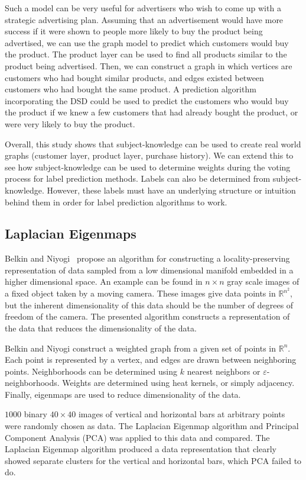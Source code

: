 Such a model can be very useful for advertisers who wish to come up with a
strategic advertising plan. Assuming that an advertisement would have more success if it were shown
to people more likely to buy the product being advertised, we can use the graph model to predict
which customers would buy the product. The product layer can be used to find all products similar to
the product being advertised. Then, we can construct a graph in which vertices are customers who had
bought similar products, and edges existed between customers who had bought the same product. A
prediction algorithm incorporating the DSD could be used to predict the customers who would buy the
product if we knew a few customers that had already bought the product, or were very likely to buy
the product.

Overall, this study shows that subject-knowledge can be used to create real
world graphs (customer layer, product layer, purchase history). We can extend
this to see how subject-knowledge can be used to determine weights during
the voting process for label prediction methods. Labels can also be 
determined from subject-knowledge. However, these labels must have an
underlying structure or intuition behind them in order for label prediction
algorithms to work.


\subsection{Laplacian Eigenmaps} Belkin and Niyogi~\cite{belkin2002laplacian} propose an algorithm
for constructing a locality-preserving representation of data sampled from a low dimensional
manifold embedded in a higher dimensional space. An example can be found in $n\times n$ gray scale
images of a fixed object taken by a moving camera. These images give data points in
$\mathbb{R}^{n^{2}}$, but the inherent dimensionality of this data should be the number of degrees
of freedom of the camera. The presented algorithm constructs a representation of the data that
reduces the dimensionality of the data.

Belkin and Niyogi construct a weighted graph from a given set of points
in $\mathbb{R}^{n}$. Each point is represented by a vertex, and edges are drawn between neighboring
points. Neighborhoods can be determined using $k$ nearest neighbors or $\varepsilon$-neighborhoods.
Weights are determined using heat kernels, or simply adjacency. Finally, eigenmaps are used to
reduce dimensionality of the data.

$1000$ binary $40 \times 40$ images of vertical and horizontal bars at arbitrary points were
randomly chosen as data. The Laplacian Eigenmap algorithm and Principal Component Analysis (PCA) was
applied to this data and compared. The Laplacian Eigenmap algorithm produced a data representation
that clearly showed separate clusters for the vertical and horizontal bars, which PCA failed to do.

